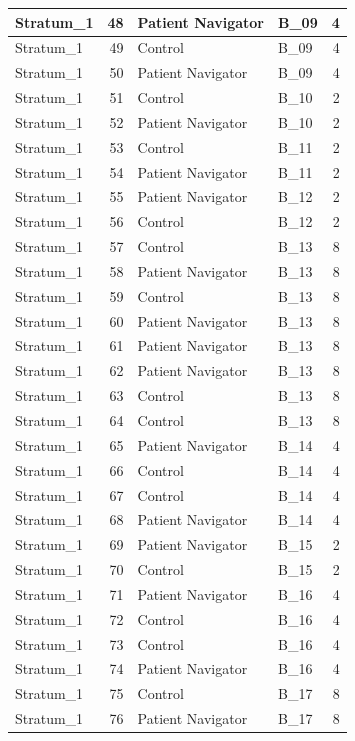 \documentclass[
]{book}
\begin{document}
\begin{table}[H]
\begin{tabular}{l|r|l|l|r}
\hline
Stratum\_1 & 48 & Patient Navigator & B\_09 & 4\\
\hline
Stratum\_1 & 49 & Control & B\_09 & 4\\
\hline
Stratum\_1 & 50 & Patient Navigator & B\_09 & 4\\
\hline
Stratum\_1 & 51 & Control & B\_10 & 2\\
\hline
Stratum\_1 & 52 & Patient Navigator & B\_10 & 2\\
\hline
Stratum\_1 & 53 & Control & B\_11 & 2\\
\hline
Stratum\_1 & 54 & Patient Navigator & B\_11 & 2\\
\hline
Stratum\_1 & 55 & Patient Navigator & B\_12 & 2\\
\hline
Stratum\_1 & 56 & Control & B\_12 & 2\\
\hline
Stratum\_1 & 57 & Control & B\_13 & 8\\
\hline
Stratum\_1 & 58 & Patient Navigator & B\_13 & 8\\
\hline
Stratum\_1 & 59 & Control & B\_13 & 8\\
\hline
Stratum\_1 & 60 & Patient Navigator & B\_13 & 8\\
\hline
Stratum\_1 & 61 & Patient Navigator & B\_13 & 8\\
\hline
Stratum\_1 & 62 & Patient Navigator & B\_13 & 8\\
\hline
Stratum\_1 & 63 & Control & B\_13 & 8\\
\hline
Stratum\_1 & 64 & Control & B\_13 & 8\\
\hline
Stratum\_1 & 65 & Patient Navigator & B\_14 & 4\\
\hline
Stratum\_1 & 66 & Control & B\_14 & 4\\
\hline
Stratum\_1 & 67 & Control & B\_14 & 4\\
\hline
Stratum\_1 & 68 & Patient Navigator & B\_14 & 4\\
\hline
Stratum\_1 & 69 & Patient Navigator & B\_15 & 2\\
\hline
Stratum\_1 & 70 & Control & B\_15 & 2\\
\hline
Stratum\_1 & 71 & Patient Navigator & B\_16 & 4\\
\hline
Stratum\_1 & 72 & Control & B\_16 & 4\\
\hline
Stratum\_1 & 73 & Control & B\_16 & 4\\
\hline
Stratum\_1 & 74 & Patient Navigator & B\_16 & 4\\
\hline
Stratum\_1 & 75 & Control & B\_17 & 8\\
\hline
Stratum\_1 & 76 & Patient Navigator & B\_17 & 8\\

\end{tabular}
\end{table}
\end{document}
